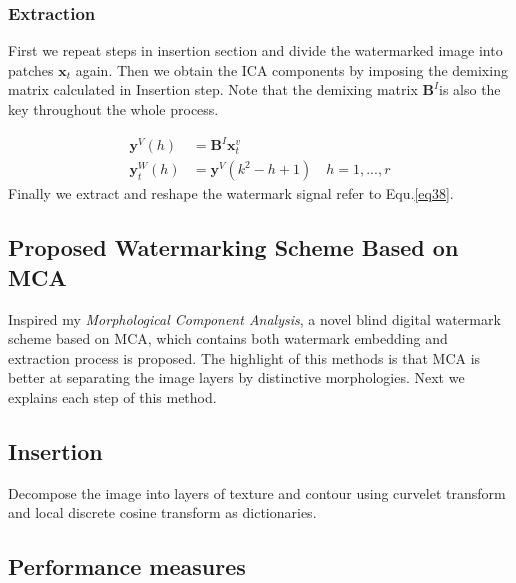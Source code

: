 \subsubsection{Extraction}
First we repeat steps in insertion section and divide the watermarked image into patches $\mathbf{x}_t$ again. Then we obtain the ICA components by imposing the demixing matrix calculated in Insertion step. Note that the demixing matrix $\mathbf{B}^I$is also the key throughout the whole process.

\begin{align}
    \mathbf{y}^V(h)  &=  \mathbf{B}^I\mathbf{x}_t^v \\
    \mathbf{y}_t^W(h) &= \mathbf{y}^V(k^2-h+1) \quad h = 1,...,r
    \label{eq38}
\end{align}
Finally we extract and reshape the watermark signal refer to Equ.\ref{eq38}. 

\subsection{Proposed Watermarking Scheme Based on MCA}
Inspired my \textit{Morphological Component Analysis}, a novel blind digital watermark scheme based on MCA, which contains both watermark embedding and extraction process is proposed. The highlight of this methods is that MCA is better at separating the image layers by distinctive morphologies. Next we explains each step of this method.

\subsection{Insertion}
Decompose the image into layers of texture and contour using curvelet transform and local discrete cosine transform as dictionaries.



\subsection{Performance measures}
